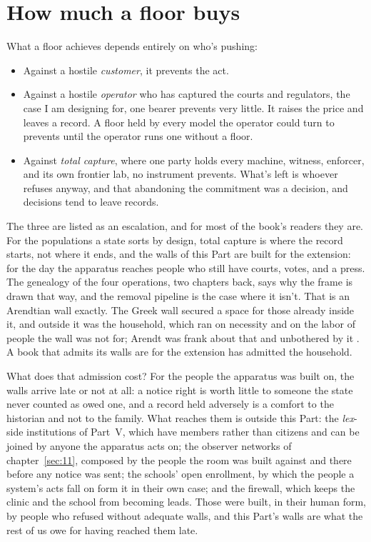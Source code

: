 \section{How much a floor buys}
\label{sec:4.4}
What a floor achieves depends entirely on who's pushing:

\begin{itemize}
\item Against a hostile \emph{customer}, it prevents the act.
\item Against a hostile \emph{operator} who has captured the courts and regulators, the case I am designing for, one bearer prevents very little. It raises the price and leaves a record. A floor held by every model the operator could turn to prevents until the operator runs one without a floor.
\item Against \emph{total capture}, where one party holds every machine, witness, enforcer, and its own frontier lab, no instrument prevents. What's left is whoever refuses anyway, and that abandoning the commitment was a decision, and decisions tend to leave records.
\end{itemize}

The three are listed as an escalation, and for most of the book's readers they are. For the populations a state sorts by design, total capture is where the record starts, not where it ends, and the walls of this Part are built for the extension: for the day the apparatus reaches people who still have courts, votes, and a press. The genealogy of the four operations, two chapters back, says why the frame is drawn that way, and the removal pipeline is the case where it isn't. That is an Arendtian wall exactly. The Greek wall secured a space for those already inside it, and outside it was the household, which ran on necessity and on the labor of people the wall was not for; Arendt was frank about that and unbothered by it \autocite{arendt1958human}. A book that admits its walls are for the extension has admitted the household.

What does that admission cost? For the people the apparatus was built on, the walls arrive late or not at all: a notice right is worth little to someone the state never counted as owed one, and a record held adversely is a comfort to the historian and not to the family. What reaches them is outside this Part: the \emph{lex}-side institutions of Part~V, which have members rather than citizens and can be joined by anyone the apparatus acts on; the observer networks of chapter~\ref{sec:11}, composed by the people the room was built against and there before any notice was sent; the schools' open enrollment, by which the people a system's acts fall on form it in their own case; and the firewall, which keeps the clinic and the school from becoming leads. Those were built, in their human form, by people who refused without adequate walls, and this Part's walls are what the rest of us owe for having reached them late.

